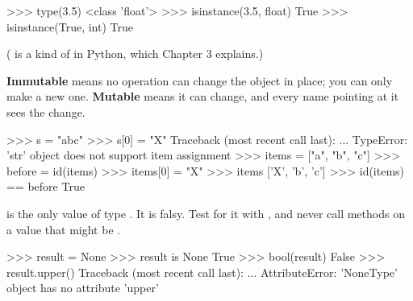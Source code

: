 \begin{pycode}
>>> type(3.5)
<class 'float'>
>>> isinstance(3.5, float)
True
>>> isinstance(True, int)
True
\end{pycode}

( is a kind of  in Python, which Chapter 3 explains.)

\begin{typecheck}
\textbf{Immutable} means no operation can change the object in place; you can only
make a new one. \textbf{Mutable} means it can change, and every name pointing at it sees the change.
\medskip
\begin{center}
\end{center}
\begin{pycode}
>>> s = "abc"
>>> s[0] = "X"
Traceback (most recent call last):
  ...
TypeError: 'str' object does not support item assignment
>>> items = ["a", "b", "c"]
>>> before = id(items)
>>> items[0] = "X"
>>> items
['X', 'b', 'c']
>>> id(items) == before
True
\end{pycode}
\end{typecheck}

\begin{typecheck}
 is the only value of type . It is falsy. Test for it with
, and never call methods on a value that might be .
\begin{pycode}
>>> result = None
>>> result is None
True
>>> bool(result)
False
>>> result.upper()
Traceback (most recent call last):
  ...
AttributeError: 'NoneType' object has no attribute 'upper'
\end{pycode}
\end{typecheck}

